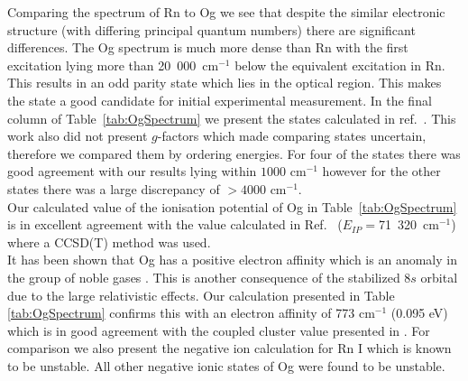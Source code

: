 \documentclass[10pt,a4paper, twoside, openright]{report}
\begin{document}
\linebreak
Comparing the spectrum of Rn  to Og we see that despite the similar electronic structure (with differing principal quantum numbers) there are significant differences. The Og spectrum is much more dense than Rn  with the first excitation lying more than 20~000~cm$^{-1}$ below the equivalent excitation in Rn. This results in an odd parity state which lies in the optical region. This makes the  state a good candidate for initial experimental measurement. In the final column of Table~\ref{tab:OgSpectrum} we present the states calculated in ref.~\cite{Indelicato2007}. This work also did not present $g$-factors which made comparing states uncertain, therefore we compared them by ordering energies. For four of the states there was good agreement with our results lying within $1000$ cm$^{-1}$ however for the other states there was a large discrepancy of $>4000$ cm$^{-1}$.  \\
\linebreak
Our calculated value of the ionisation potential of Og in Table~\ref{tab:OgSpectrum} is in excellent agreement with the value calculated in Ref.~\cite{Jerabek2018} ($E_{IP}=$71~320~cm$^{-1}$) where a CCSD(T) method was used. \\
\linebreak
It has been shown that Og has a positive electron affinity which is an anomaly in the group of noble gases \cite{EliavOg1996, Goidenko2003, Eliav2015}. This is another consequence of the stabilized $8s$ orbital due to the large relativistic effects. Our calculation presented in Table \ref{tab:OgSpectrum}  confirms this with an electron affinity of 773 cm$^{-1}$ (0.095 eV) which is in good agreement with the coupled cluster value presented in \cite{Goidenko2003}. For comparison we also present the negative ion calculation for Rn I which is known to be unstable. All other negative ionic states of Og were found to be unstable.
\newpage
\end{document}
